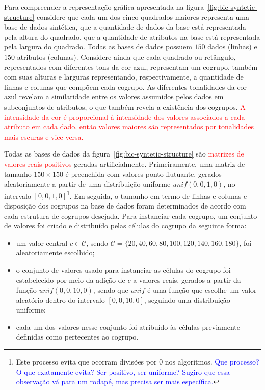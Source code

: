 \documentclass[
    12pt,                %
    oneside,            %
    a4paper,            %
    english,            %
    brazil                %
    ]{abntex2ppgsi}
\begin{document}
Para compreender a representação gráfica apresentada na figura~\ref{fig:bic-syntetic-structure} considere que cada um dos cinco quadrados maiores representa uma base de dados sintética, que a quantidade de dados da base está representada pela altura do quadrado, que a quantidade de atributos na base está representada pela largura do quadrado. Todas as bases de dados possuem $150$ dados (linhas) e $150$ atributos (colunas). Considere ainda que cada quadrado ou retângulo, representados com diferentes tons da cor azul, representam um cogrupo, também com suas alturas e larguras representando, respectivamente, a quantidade de linhas e colunas que compõem cada cogrupo. As diferentes tonalidades da cor azul revelam a similaridade entre os valores assumidos pelos dados em subconjuntos de atributos, o que também revela a existência dos cogrupos. \textcolor{red}{A intensidade da cor é proporcional à intensidade dos valores associados a cada atributo em cada dado, então valores maiores são representados por tonalidades mais escuras e vice-versa.}


Todas as bases de dados da figura~\ref{fig:bic-syntetic-structure} são \textcolor{red}{matrizes de valores reais positivos} geradas artificialmente. Primeiramente, uma matriz de tamanho $150 \times 150$ é preenchida com valores ponto flutuante, gerados aleatoriamente a partir de uma distribuição uniforme $unif(0,0, 1,0)$, no intervalo $[0,0, 1,0]$\footnote{Este processo evita que ocorram divisões por $0$ nos algoritmos. \textcolor{blue}{Que processo? O que exatamente evita? Ser positivo, ser uniforme? Sugiro que essa observação vá para um rodapé, mas precisa ser mais específica.}}. Em seguida, o tamanho em termo de linhas e colunas e disposição dos cogrupos na base de dados foram determinados de acordo com cada estrutura de cogrupos desejada. Para instanciar cada cogrupo, um conjunto de valores foi criado e distribuído pelas células do cogrupo da seguinte forma:


\begin{itemize}
\item um valor central $c \in \mathcal{C}$, sendo $\mathcal{C} = \{ 20, 40, 60, 80, 100, 120, 140, 160, 180 \}$, foi aleatoriamente escolhido;
\item o conjunto de valores usado para instanciar as células do cogrupo foi estabelecido por meio da adição de $c$ a valores reais, gerados a partir da função $unif(0,0, 10,0)$, sendo que $unif$ é uma função que escolhe um valor aleatório dentro do intervalo $[0,0,10,0]$, seguindo uma distribuição uniforme; 
\item  cada um dos valores nesse conjunto foi atribuído às células previamente definidas como pertecentes ao cogrupo.
\end{itemize}
\end{document}
